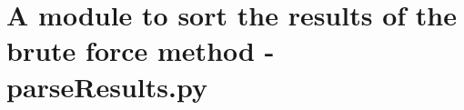 
\chapter{A module to sort the results of the brute force method - parseResults.py} %

\label{AppendixE} %









